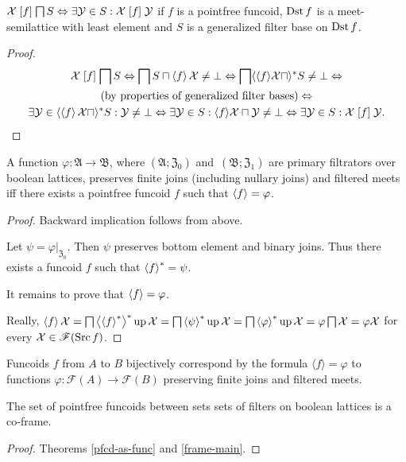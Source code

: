 \begin{prop}
$\mathcal{X}\mathrel{\left[f\right]}\bigsqcap S\Leftrightarrow\exists\mathcal{Y}\in S:\mathcal{X}\mathrel{\left[f\right]}\mathcal{Y}$
if $f$ is a pointfree funcoid, $\operatorname{Dst} f$ is a meet-semilattice with
least element and $S$ is a generalized filter base on $\operatorname{Dst} f$.\end{prop}
\begin{proof}
~
\begin{multline*}
\mathcal{X}\mathrel{\left[f\right]}\bigsqcap S\Leftrightarrow\bigsqcap S\sqcap\left\langle f\right\rangle\mathcal{X}\neq\bot\Leftrightarrow\bigsqcap\langle\langle f\rangle\mathcal{X}\sqcap\rangle^{\ast}S\neq\bot\Leftrightarrow\\
\text{(by properties of generalized filter bases)}\Leftrightarrow\\
\exists\mathcal{Y}\in\langle\left\langle f\right\rangle\mathcal{X}\sqcap\rangle^{\ast}S:\mathcal{Y}\neq\bot\Leftrightarrow\exists\mathcal{Y}\in S:\langle f\rangle\mathcal{X}\sqcap\mathcal{Y}\neq\bot\Leftrightarrow\exists\mathcal{Y}\in S:\mathcal{X}\mathrel{\left[f\right]}\mathcal{Y}.
\end{multline*}
\end{proof}
\begin{thm}
\label{pfcd-as-func}A function $\varphi:\mathfrak{A}\rightarrow\mathfrak{B}$,
where $(\mathfrak{A};\mathfrak{Z}_{0})$ and~$(\mathfrak{B};\mathfrak{Z}_{1})$
are primary filtrators over boolean lattices, preserves finite joins
(including nullary joins) and filtered meets iff there exists a pointfree
funcoid $f$ such that $\left\langle f\right\rangle=\varphi$.\end{thm}
\begin{proof}
Backward implication follows from above.

Let $\psi=\varphi|_{\mathfrak{Z}_{0}}$. Then $\psi$ preserves bottom
element and binary joins. Thus there exists a funcoid $f$ such that
$\left\langle f\right\rangle ^{\ast}=\psi$.

It remains to prove that $\left\langle f\right\rangle=\varphi$.

Really, $\left\langle f\right\rangle\mathcal{X}=\bigsqcap\left\langle \left\langle f\right\rangle ^{\ast}\right\rangle ^{\ast}\operatorname{up}\mathcal{X}=\bigsqcap\left\langle \psi\right\rangle ^{\ast}\operatorname{up}\mathcal{X}=\bigsqcap\left\langle \varphi\right\rangle ^{\ast}\operatorname{up}\mathcal{X}=\varphi\bigsqcap\mathcal{X}=\varphi\mathcal{X}$
for every $\mathcal{X}\in\mathscr{F}(\operatorname{Src} f)$.\end{proof}
\begin{cor}
Funcoids $f$ from $A$ to $B$ bijectively correspond by the formula
$\langle f\rangle=\varphi$ to functions $\varphi:\mathscr{F}(A)\rightarrow\mathscr{F}(B)$
preserving finite joins and filtered meets.\end{cor}
\begin{thm}
The set of pointfree funcoids between sets sets of filters on boolean
lattices is a co-frame.\end{thm}
\begin{proof}
Theorems \ref{pfcd-as-func} and \ref{frame-main}.
\end{proof}

